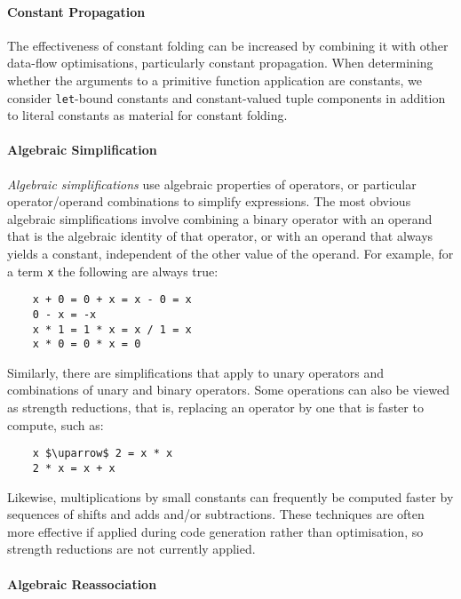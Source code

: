 \paragraph{Constant Propagation}

The effectiveness of constant folding can be increased by combining it with
other data-flow optimisations, particularly constant propagation. When
determining whether the arguments to a primitive function application are
constants, we consider \texttt{let}-bound constants and constant-valued tuple
components in addition to literal constants as material for constant folding.


\paragraph{Algebraic Simplification}

\emph{Algebraic simplifications} use algebraic properties of operators, or
particular operator/operand combinations to simplify expressions. The most
obvious algebraic simplifications involve combining a binary operator with an
operand that is the algebraic identity of that operator, or with an operand that
always yields a constant, independent of the other value of the operand. For
example, for a term \texttt{x} the following are always true:
%
\begin{lstlisting}[style=Haskell,numbers=none]
%\bf$\langle$ algebraic simplification $\rangle$%
    x + 0 = 0 + x = x - 0 = x
    0 - x = -x
    x * 1 = 1 * x = x / 1 = x
    x * 0 = 0 * x = 0
\end{lstlisting}
%
Similarly, there are simplifications that apply to unary operators and
combinations of unary and binary operators. Some operations can also be viewed
as strength reductions, that is, replacing an operator by one that is faster to
compute, such as:
%
\begin{lstlisting}[style=Haskell,numbers=none,mathescape]
%\bf$\langle$ strength reduction $\rangle$%
    x $\uparrow$ 2 = x * x
    2 * x = x + x
\end{lstlisting}
%
Likewise, multiplications by small constants can frequently be computed faster
by sequences of shifts and adds and/or subtractions. These techniques are often
more effective if applied during code generation rather than optimisation, so
strength reductions are not currently applied.


\paragraph{Algebraic Reassociation}


